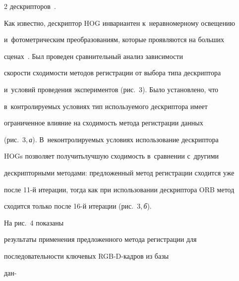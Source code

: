 \begin{multicols}{2}
дескрипторов~\cite{21-voh, 22-voh}.

  

  

  

  Как известно, дескриптор HOG инвариантен к~неравномерному освещению 

и~фотометрическим преобразованиям, которые проявляются на больших 

сценах~\cite{15-voh}. Был проведен сравнительный анализ за\-ви\-си\-мости 

ско\-рости схо\-ди\-мости методов регистрации от выбора типа дескриптора 

и~условий проведения экспериментов (рис.~3). Было установлено, что 

в~конт\-ро\-ли\-ру\-емых условиях тип используемого дескриптора имеет 

ограниченное влияние на схо\-ди\-мость метода регистрации данных\linebreak 

(рис.~3,\,\textit{а}). В~неконтролируемых условиях ис\-поль\-зование дескриптора 

HOGs позволяет получить\linebreak лучшую схо\-ди\-мость в~сравнении с~другими 

дескрипторными методами: предложенный метод регистрации сходится уже 

после 11-й итерации, тогда как при использовании дескриптора ORB метод 

сходится только после 16-й итерации (рис.~3,\,\textit{б}).



 На рис.~4 показаны 

результаты применения предложенного метода регистрации для 

по\-сле\-до\-ва\-тель\-ности ключевых RGB-D-кадров из базы 

дан-\linebreak\vspace*{-10pt}



\pagebreak



\end{multicols}




